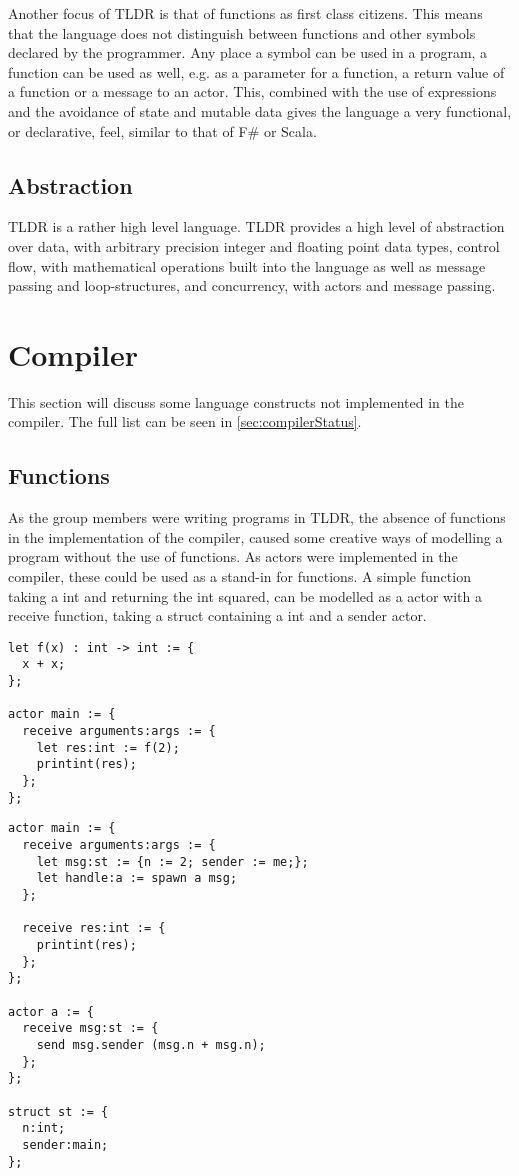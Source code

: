 Another focus of TLDR is that of functions as first class citizens. This means that the language does not distinguish between functions and other symbols declared by the programmer. Any place a symbol can be used in a program, a function can be used as well, e.g. as a parameter for a function, a return value of a function or a message to an actor. This, combined with the use of expressions and the avoidance of state and mutable data gives the language a very functional, or declarative, feel, similar to that of F\# or Scala.

\subsection{Abstraction}
TLDR is a rather high level language. TLDR provides a high level of abstraction over data, with arbitrary precision integer and floating point data types, control flow, with mathematical operations built into the language as well as message passing and loop-structures, and concurrency, with actors and message passing.

\section{Compiler}

This section will discuss some language constructs not implemented in the compiler. The full list can be seen in \cref{sec:compilerStatus}.

\subsection{Functions}

As the group members were writing programs in TLDR, the absence of functions in the implementation of the compiler, caused some creative ways of modelling a program without the use of functions. As actors were implemented in the compiler, these could be used as a stand-in for functions. A simple function taking a int and returning the int squared, can be modelled as a actor with a receive function, taking a struct containing a int and a sender actor. 

\begin{lstlisting}[style=TLDR, caption = {Simple example using a function.}]
let f(x) : int -> int := {
  x + x;
};

actor main := {
  receive arguments:args := {
    let res:int := f(2);
    printint(res);
  };
};
\end{lstlisting}
\begin{lstlisting}[style=TLDR, caption = {Example of modeling a function taking a int and returning the int squared, as an actor.}]
actor main := {
  receive arguments:args := {
    let msg:st := {n := 2; sender := me;};
    let handle:a := spawn a msg;
  };
  
  receive res:int := {
    printint(res);
  };
};

actor a := {
  receive msg:st := {
    send msg.sender (msg.n + msg.n);
  };
};

struct st := {
  n:int;
  sender:main;
};
\end{lstlisting}

